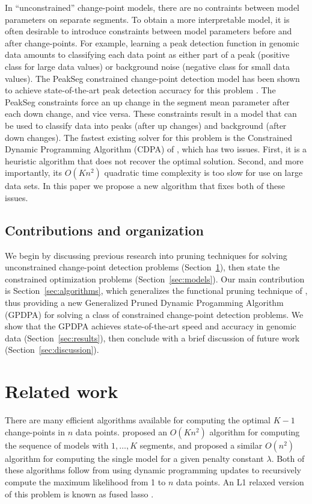 \documentclass{article}
\begin{document}
In ``unconstrained'' change-point models, there are no contraints
between model parameters on separate segments. To obtain a more
interpretable model, it is often desirable to introduce constraints
between model parameters before and after change-points. For example,
learning a peak detection function in genomic data amounts to
classifying each data point as either part of a peak (positive class
for large data values) or background noise (negative class for small
data values). The PeakSeg constrained change-point detection model has
been shown to achieve state-of-the-art peak detection accuracy for
this problem \citep{HOCKING2016-chipseq}. The PeakSeg constraints
force an up change in the segment mean parameter after each down
change, and vice versa. These constraints result in a model that can
be used to classify data into peaks (after up changes) and background
(after down changes). The fastest existing solver for this problem is
the Constrained Dynamic Programming Algorithm (CDPA) of
\citet{HOCKING-PeakSeg}, which has two issues. First, it is a
heuristic algorithm that does not recover the optimal
solution. Second, and more importantly, its $O(Kn^2)$ quadratic time
complexity is too slow for use on large data sets.
In this paper we propose a new algorithm that fixes both of these
issues. 

\subsection{Contributions and organization}

We begin by discussing previous research into pruning techniques for
solving unconstrained change-point detection problems
(Section~\ref{sec:related}), then state the constrained optimization
problems (Section~\ref{sec:models}). Our main contribution is
Section~\ref{sec:algorithms}, which generalizes the functional pruning
technique of \citet{pruned-dp}, thus providing a new Generalized
Pruned Dynamic Progamming Algorithm (GPDPA) for solving a class of
constrained change-point detection problems. We show that the GPDPA
achieves state-of-the-art speed and accuracy in genomic data
(Section~\ref{sec:results}), then conclude with a brief discussion of
 future work (Section~\ref{sec:discussion}).

\section{Related work}
\label{sec:related}

There are many efficient algorithms available for computing the
optimal $K-1$ change-points in $n$ data
points. \citet{segment-neighborhood} proposed an $O(K n^2)$ algorithm
for computing the sequence of models with $1,\dots,K$ segments, and
\citet{optimal-partitioning} proposed a similar $O(n^2)$ algorithm for
computing the single model for a given penalty constant
$\lambda$. Both of these algorithms follow from using dynamic
programming updates \citep{bellman} to recursively compute the maximum
likelihood from 1 to $n$ data points. An L1 relaxed version of this
problem is known as fused lasso \citep{fused-lasso}.
\end{document}
